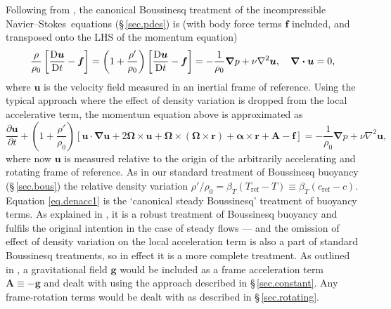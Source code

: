\documentclass[11pt]{report}
\newcommand\NavSto{Navier--Stokes}
\begin{document}
Following from \citet{blss21}, the canonical Boussinesq treatment of
the incompressible \NavSto\ equations (\S\,\ref{sec.pdes}) is
(with body force terms $\bm{f}$ included, and transposed onto the LHS
of the momentum equation)
\begin{equation}
  \frac{\rho}{\rho_0}\left[\frac{\mathrm{D}\bm{u}}{\mathrm{D} t}-\bm{f}\right] = \left(1 +
  \frac{\rho'}{\rho_0}\right)\left[\frac{\mathrm{D}\bm{u}}{\mathrm{D} t}-\bm{f}\right]=
  -\frac{1}{\rho_0}\bm{\nabla}p+\nu\nabla^2\bm{u}, \quad \bm{\nabla\cdot u}=0,
\label{eq.full}
\end{equation}
where $\bm{u}$ is the velocity field measured in an inertial frame of
reference.  Using the typical approach where the effect of density
variation is dropped from the local accelerative term, the momentum
equation above is approximated as
\begin{equation}
  \frac{\partial\bm{u}}{\partial t} +
  \left(1+\frac{\rho'}{\rho_0}\right)\left[\bm{u\cdot\nabla u} +
   2\bm{\Omega}\!\times\!\bm{u} + \bm{\Omega}\!\times\!(\bm{\Omega}\!\times\!\bm{r}) +
  \bm{\alpha}\!\times\!\bm{r} + \bm{A} -\bm{f}\right]
  =   -\frac{1}{\rho_0}\bm{\nabla}p+\nu\nabla^2\bm{u},
\label{eq.denacc1}  
\end{equation}
where now $\bm{u}$ is measured relative to the origin of the
arbitrarily accelerating and rotating frame of reference.  As in our
standard treatment of Boussinesq buoyancy (\S\,\ref{sec.bous}) the
relative density variation
$\rho'/\rho_0=\beta_T(T_\text{ref}-T)\equiv\beta_T(c_\text{ref}-c)$.
Equation \eqref{eq.denacc1} is the `canonical steady Boussinesq'
treatment of buoyancy terms.  As explained in \citeauthor{blss21}, it
is a robust treatment of Boussinesq buoyancy and fulfils the original
intention in the case of steady flows --- and the omission of effect
of density variation on the local acceleration term is also a part of
standard Boussinesq treatments, so in effect it is a more complete
treatment.  As outlined in \citeauthor{blss21}, a gravitational field
$\bm{g}$ would be included as a frame acceleration term
$\bm{A}\equiv-\bm{g}$ and dealt with using the approach described in
\S\,\ref{sec.constant}.  Any frame-rotation terms would be dealt with
as described in \S\,\ref{sec.rotating}.
\end{document}
